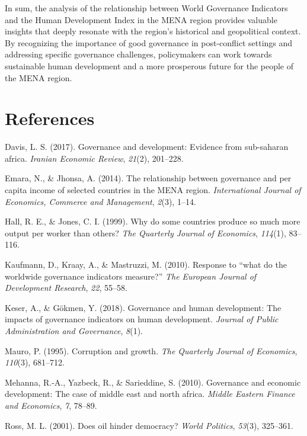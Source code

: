 \documentclass[
  12pt,
]{article}
\newlength{\cslhangindent}
\newlength{\cslentryspacingunit} %
\newenvironment{CSLReferences}[2] %
 {%
  \setlength{\parindent}{0pt}
  \ifodd #1
  \let\oldpar\par
  \def\par{\hangindent=\cslhangindent\oldpar}
  \fi
  \setlength{\parskip}{#2\cslentryspacingunit}
 }%
 {}
\begin{document}
In sum, the analysis of the relationship between World Governance Indicators and the Human Development Index in the MENA region provides valuable insights that deeply resonate with the region's historical and geopolitical context. By recognizing the importance of good governance in post-conflict settings and addressing specific governance challenges, policymakers can work towards sustainable human development and a more prosperous future for the people of the MENA region.

\newpage

\hypertarget{references}{%
\section{References}\label{references}}

\hypertarget{refs}{}
\begin{CSLReferences}{1}{0}
\leavevmode{}%
Davis, L. S. (2017). Governance and development: Evidence from sub-saharan africa. \emph{Iranian Economic Review}, \emph{21}(2), 201--228.

\leavevmode{}%
Emara, N., \& Jhonsa, A. (2014). The relationship between governance and per capita income of selected countries in the MENA region. \emph{International Journal of Economics, Commerce and Management}, \emph{2}(3), 1--14.

\leavevmode{}%
Hall, R. E., \& Jones, C. I. (1999). Why do some countries produce so much more output per worker than others? \emph{The Quarterly Journal of Economics}, \emph{114}(1), 83--116.

\leavevmode{}%
Kaufmann, D., Kraay, A., \& Mastruzzi, M. (2010). Response to {``what do the worldwide governance indicators measure?''} \emph{The European Journal of Development Research}, \emph{22}, 55--58.

\leavevmode{}%
Keser, A., \& Gökmen, Y. (2018). Governance and human development: The impacts of governance indicators on human development. \emph{Journal of Public Administration and Governance}, \emph{8}(1).

\leavevmode{}%
Mauro, P. (1995). Corruption and growth. \emph{The Quarterly Journal of Economics}, \emph{110}(3), 681--712.

\leavevmode{}%
Mehanna, R.-A., Yazbeck, R., \& Sarieddine, S. (2010). Governance and economic development: The case of middle east and north africa. \emph{Middle Eastern Finance and Economics}, \emph{7}, 78--89.

\leavevmode{}%
Ross, M. L. (2001). Does oil hinder democracy? \emph{World Politics}, \emph{53}(3), 325--361.

\end{CSLReferences}
\end{document}
